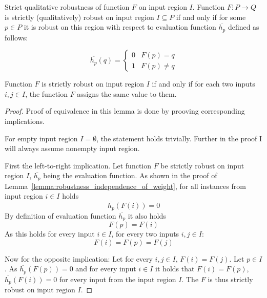 \begin{definition}{Strict qualitative robustness of function $F$ on input region $I$.}
    Function $F: P\to Q$ is strictly (qualitatively) robust on input region $I\subseteq P$
    if and only if for some $p\in P$ it is robust on this region with respect
    to evaluation function $\overline{h_p}$ defined as follows:

    \begin{equation*}
        \overline{h_p}(q) = \left\{\begin{matrix}
            0 & F(p) = q\\
            1 & F(p) \neq q
        \end{matrix}\right.
    \end{equation*}
\end{definition}

\begin{lemma}{Function $F$ is strictly robust on input region $I$
    if and only if for each two inputs $i, j\in I$, the function $F$ assigns the same value to them.}
    \begin{proof}
        Proof of equivalence in this lemma is done
        by prooving corresponding implications.

        For empty input region $I=\emptyset$, the statement holds trivially.
        Further in the proof I will always assume nonempty input region.

        First the left-to-right implication.
        Let function $F$ be strictly robust on input region $I$,
        $\overline{h_p}$ being the evaluation function.
        As shown in the proof of Lemma~\ref{lemma:robustness_independence_of_weight},
        for all instances from input region $i\in I$ holds
        \begin{equation*}
            \overline{h_p}(F(i)) = 0
        \end{equation*}
        By definition of evaluation function $\overline{h_p}$ it also holds
        \begin{equation*}
            F(p) = F(i)
        \end{equation*}
        As this holds for every input $i\in I$, for every two inputs $i, j\in I$:
        \begin{equation*}
            F(i) = F(p) = F(j)
        \end{equation*}

        Now for the opposite implication: Let for every $i, j\in I$, $F(i) = F(j)$.
        Let $p\in I$. As $\overline{h_p}(F(p)) = 0$
        and for every input $i\in I$ it holds that $F(i) = F(p)$,
        $\overline{h_p}(F(i)) = 0$ for every input from the input region $I$.
        The $F$ is thus strictly robust on input region $I$.
    \end{proof}
\end{lemma}

